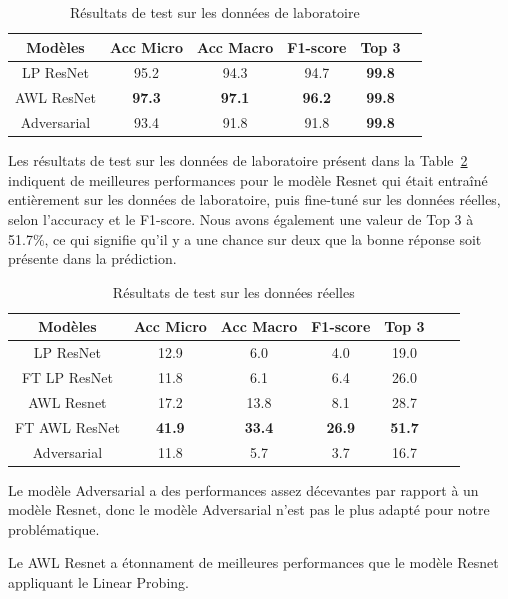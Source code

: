 \documentclass[a4paper]{article}
\begin{document}
\begin{table}[ht]
  \centering
    \begin{tabular}{cccccc}
    \toprule
    Modèles & Acc Micro & Acc Macro & F1-score & Top 3 \\
    \midrule
    LP ResNet & 95.2 & 94.3 & 94.7 & \textbf{99.8} \\
    AWL ResNet & \textbf{97.3} & \textbf{97.1} & \textbf{96.2} & \textbf{99.8} \\
    Adversarial & 93.4 & 91.8 & 91.8 & \textbf{99.8} \\
    \bottomrule
    \end{tabular}
    \caption{Résultats de test sur les données de laboratoire}
    \label{tab:results_lab}
\end{table}

Les résultats de test sur les données de laboratoire présent dans la Table~\ref{tab: results_real} indiquent de meilleures performances pour le modèle Resnet qui était entraîné entièrement sur les données de laboratoire, puis fine-tuné sur les données réelles, selon l'accuracy et le F1-score. 
Nous avons également une valeur de Top 3 à 51.7\%, ce qui signifie qu'il y a une chance sur deux que la bonne réponse soit présente dans la prédiction. 

\begin{table}[ht]
  \centering
    \begin{tabular}{ccccccc}
    \toprule
    Modèles & Acc Micro & Acc Macro & F1-score & Top 3 \\
    \midrule
    LP ResNet & 12.9 & 6.0 & 4.0 & 19.0 \\
    FT LP ResNet & 11.8 & 6.1 & 6.4 & 26.0 \\
    AWL Resnet & 17.2 & 13.8 & 8.1 & 28.7 \\
    FT AWL ResNet & \textbf{41.9} & \textbf{33.4} & \textbf{26.9} & \textbf{51.7} \\
    Adversarial & 11.8 & 5.7 & 3.7 & 16.7 \\
    \bottomrule
    \end{tabular}
    \caption{Résultats de test sur les données réelles}
    \label{tab: results_real}
\end{table}

Le modèle Adversarial a des performances assez décevantes par rapport à un modèle Resnet, donc le modèle Adversarial n'est pas le plus adapté pour notre problématique.

Le AWL Resnet a étonnament de meilleures performances que le modèle Resnet appliquant le Linear Probing. 
\end{document}
